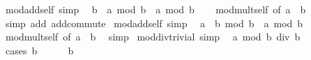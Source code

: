\begin{isabellebody}
{\isafoldproof}%
%
\isadelimproof
\isanewline
%
\endisadelimproof
\isanewline
{}\isamarkupfalse%
\ mod{\isacharunderscore}{\kern0pt}add{\isacharunderscore}{\kern0pt}self{}\ {\isacharbrackleft}{\kern0pt}simp{\isacharbrackright}{\kern0pt}{\isacharcolon}{\kern0pt}\isanewline
\ \ {\isachardoublequoteopen}{\isacharparenleft}{\kern0pt}b\ {\isacharplus}{\kern0pt}\ a{\isacharparenright}{\kern0pt}\ mod\ b\ {\isacharequal}{\kern0pt}\ a\ mod\ b{\isachardoublequoteclose}\isanewline
%
\isadelimproof
\ \ %
\endisadelimproof
%
\isatagproof
{}\isamarkupfalse%
\ mod{\isacharunderscore}{\kern0pt}mult{\isacharunderscore}{\kern0pt}self{}\ {\isacharbrackleft}{\kern0pt}of\ a\ {}\ b{\isacharbrackright}{\kern0pt}\ \isamarkupfalse%
\ {\isacharparenleft}{\kern0pt}simp\ add{\isacharcolon}{\kern0pt}\ add{\isachardot}{\kern0pt}commute{\isacharparenright}{\kern0pt}%
\endisatagproof
{\isafoldproof}%
%
\isadelimproof
\isanewline
%
\endisadelimproof
\isanewline
{}\isamarkupfalse%
\ mod{\isacharunderscore}{\kern0pt}add{\isacharunderscore}{\kern0pt}self{}\ {\isacharbrackleft}{\kern0pt}simp{\isacharbrackright}{\kern0pt}{\isacharcolon}{\kern0pt}\isanewline
\ \ {\isachardoublequoteopen}{\isacharparenleft}{\kern0pt}a\ {\isacharplus}{\kern0pt}\ b{\isacharparenright}{\kern0pt}\ mod\ b\ {\isacharequal}{\kern0pt}\ a\ mod\ b{\isachardoublequoteclose}\isanewline
%
\isadelimproof
\ \ %
\endisadelimproof
%
\isatagproof
{}\isamarkupfalse%
\ mod{\isacharunderscore}{\kern0pt}mult{\isacharunderscore}{\kern0pt}self{}\ {\isacharbrackleft}{\kern0pt}of\ a\ {}\ b{\isacharbrackright}{\kern0pt}\ \isamarkupfalse%
\ simp%
\endisatagproof
{\isafoldproof}%
%
\isadelimproof
\isanewline
%
\endisadelimproof
\isanewline
{}\isamarkupfalse%
\ mod{\isacharunderscore}{\kern0pt}div{\isacharunderscore}{\kern0pt}trivial\ {\isacharbrackleft}{\kern0pt}simp{\isacharbrackright}{\kern0pt}{\isacharcolon}{\kern0pt}\isanewline
\ \ {\isachardoublequoteopen}a\ mod\ b\ div\ b\ {\isacharequal}{\kern0pt}\ {}{\isachardoublequoteclose}\isanewline
%
\isadelimproof
%
\endisadelimproof
%
\isatagproof
{}\isamarkupfalse%
\ {\isacharparenleft}{\kern0pt}cases\ {\isachardoublequoteopen}b\ {\isacharequal}{\kern0pt}\ {}{\isachardoublequoteclose}{\isacharparenright}{\kern0pt}\isanewline
\ \ \isamarkupfalse%
\ {\isachardoublequoteopen}b\ {\isacharequal}{\kern0pt}\ {}{\isachardoublequoteclose}\isanewline

\end{isabellebody}
